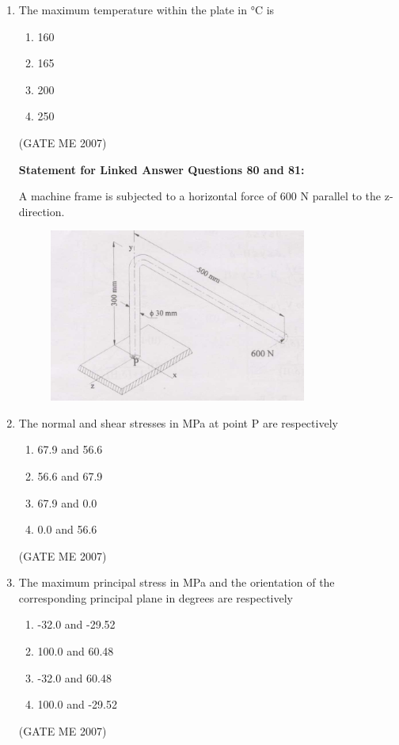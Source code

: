 \documentclass[journal]{IEEEtran}
\begin{document}
\begin{enumerate}
\item The maximum temperature within the plate in °C is
\begin{multicols}{4}
\begin{enumerate}
\item 160
\item 165
\item 200
\item 250
\end{enumerate}
\end{multicols}
\hfill (GATE ME 2007)

\textbf{Statement for Linked Answer Questions 80 and 81:}

A machine frame is subjected to a horizontal force of 600 N parallel to the z-direction.

\begin{figure}[H]
    \centering
    \includegraphics[width=0.8\textwidth]{Fig 16.png}
    \caption{}
    \label{fig:question80,81}
\end{figure}

\item The normal and shear stresses in MPa at point P are respectively
\begin{multicols}{2}
\begin{enumerate}
\item 67.9 and 56.6
\item 56.6 and 67.9
\item 67.9 and 0.0
\item 0.0 and 56.6
\end{enumerate}
\end{multicols}
\hfill (GATE ME 2007)

\item The maximum principal stress in MPa and the orientation of the corresponding principal plane in degrees are respectively
\begin{multicols}{2}
\begin{enumerate}
\item -32.0 and -29.52
\item 100.0 and 60.48
\item -32.0 and 60.48
\item 100.0 and -29.52
\end{enumerate}
\end{multicols}
\hfill (GATE ME 2007)


\end{enumerate}
\end{document}
